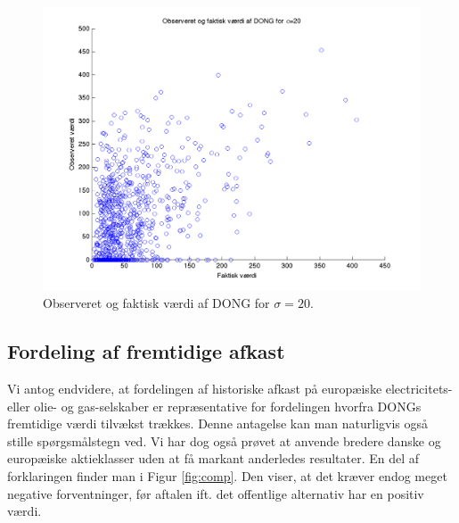 \documentclass{article}
\begin{document}
\begin{figure}
\includegraphics[scale=0.8]{../matlab/figs/observed_actual_value}
\caption{Observeret og faktisk v\ae{}rdi af DONG for $\sigma=20$.}
\label{fig:observed_actual_value}
\end{figure}

\subsection{Fordeling af fremtidige afkast}

Vi antog endvidere, at fordelingen af historiske afkast på europæiske electricitets- eller olie- og gas-selskaber er repræsentative for fordelingen hvorfra DONGs fremtidige værdi tilvækst trækkes. Denne antagelse kan man naturligvis også stille spørgsmålstegn ved. Vi har dog også prøvet at anvende bredere danske og europæiske aktieklasser uden at få markant anderledes resultater. En del af forklaringen finder man i Figur \ref{fig:comp}. Den viser, at det kræver endog meget negative forventninger, før aftalen ift. det offentlige alternativ har en positiv værdi.

\end{document}
